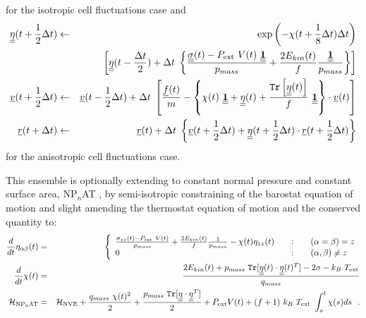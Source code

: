 for the isotropic cell fluctuations case and
\begin{eqnarray}
\mbox{$\underline{\underline{\bf \eta}}$}(t + {1 \over 2} \Delta t) &\leftarrow& \exp \left( -\chi (t + {1 \over 8} \Delta t) \Delta t \right) \nonumber \\
&& \left[ \mbox{$\underline{\underline{\bf \eta}}$}(t - {\Delta t \over 2}) + \Delta t \;
\left\{ \frac{\mbox{$\underline{\underline{\bf \sigma}}$}(t) - P_{\rm ext}~V(t)~\mbox{$\underline{\underline{\bf 1}}$}}{p_{mass}} +
\frac{2 E_{kin}(t)}{f} \frac{\mbox{$\underline{\underline{\bf 1}}$}}{p_{mass}} \right\} \right] \nonumber \\
\mbox{$\underline{v}$}(t + {1 \over 2} \Delta t) &\leftarrow& \mbox{$\underline{v}$}(t - {1 \over 2} \Delta t) + \Delta t \;
\left[{\mbox{$\underline{f}$}(t) \over m} - \left\{ \chi(t)~\mbox{$\underline{\underline{\bf 1}}$} +
\mbox{$\underline{\underline{\bf \eta}}$}(t) + \frac{{\tt Tr}\left[\mbox{$\underline{\underline{\bf \eta}}$}(t)\right]}{f}~\mbox{$\underline{\underline{\bf 1}}$} \right\} \cdot \mbox{$\underline{v}$}(t) \right] \\
\mbox{$\underline{r}$}(t + \Delta t) &\leftarrow& \mbox{$\underline{r}$}(t) + \Delta t \;
\left\{ \mbox{$\underline{v}$}(t + {1 \over 2} \Delta t) + \mbox{$\underline{\underline{\bf \eta}}$} (t + {1 \over 2} \Delta t) \cdot
\mbox{$\underline{r}$}(t + {1 \over 2} \Delta t) \right\} \nonumber
\end{eqnarray}
for the anisotropic cell fluctuations case.

This ensemble is optionally extending to constant normal pressure
and constant surface area, NP$_{n}$AT \cite{ikeguchi-04}, by semi-isotropic
constraining of the barostat equation of motion and slight amending
the thermostat equation of motion and the conserved quantity to:
\begin{eqnarray}
\frac{d}{dt} \eta_{\alpha\beta}(t) &=& \left\{ \begin{array} {l@{\qquad:\qquad}l}
\frac{\sigma_{zz}(t) - P_{\rm ext}~V(t)}{p_{mass}} + \frac{2 E_{kin}(t)}{f} \frac{1}{p_{mass}} -
\chi(t) \eta_{zz}(t) & (\alpha = \beta) = z \\
0 & (\alpha,\beta) \ne z
\end{array} \right. \nonumber \\
\frac{d}{dt} \chi(t) &=& \frac{2 E_{kin}(t) + p_{mass}~{\tt Tr}[\mat{\eta}(t) \cdot
\mat{\eta}(t)^{T}] - 2 \sigma - k_{B}~T_{\rm ext}}{q_{mass}} \\
{\cal H}_{\rm NP_{n}AT} &=& {\cal H}_{\rm NVE} + {q_{mass}~\chi (t)^{2} \over 2} +
{p_{mass}~{\tt Tr}[\mat{\eta} \cdot \mat{\eta}^{T}] \over 2} + P_{\rm ext} V(t) +
(f+1)~k_{B}~T_{\rm ext}~\int_o^t \chi (s) ds~~. \nonumber
\end{eqnarray}

